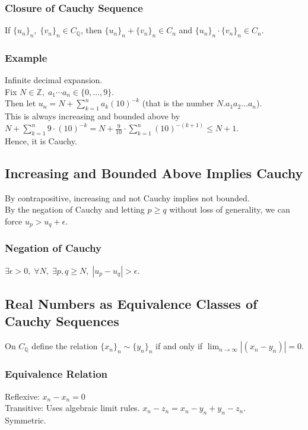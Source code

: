 \documentclass[11pt]{article}
\newcommand{\0}{\emptyset}
\newcommand{\Z}{\mathbb{Z}}
\newcommand{\Q}{\mathbb{Q}}
\begin{document}
\subsubsection*{Closure of Cauchy Sequence}
\label{sec:orgbc2540f}
If \(\{u_{n}\}_{n},\;\{v_{n}\}_{n}\in C_{\Q}\), then \(\{u_{n}\}_{n}+\{v_{n}\}_{n}\in C_{n}\) and \(\{u_{n}\}_{n}\cdot\{v_{n}\}_{n}\in C_{n}\).\\[0pt]
\subsubsection*{Example}
\label{sec:org826c81a}
Infinite decimal expansion.\\[0pt]
Fix \(N\in\Z,\; a_{1}\cdots a_{n}\in\{0,\ldots,9\}\).\\[0pt]
Then let \(u_{n}=N+\sum_{k=1}^{n}a_{k}(10)^{-k}\) (that is the number \(N.a_{1}a_{2}\ldots a_{n}\)).\\[0pt]
This is always increasing and bounded above by \(N+\sum_{k=1}^{n}9\cdot(10)^{-k}=N+\frac{9}{10}\cdot\sum_{k=1}^{n}(10)^{-(k+1)}\leq N+1\).\\[0pt]
Hence, it is Cauchy.\\[0pt]
\subsection*{Increasing and Bounded Above Implies Cauchy}
\label{sec:org15bec59}
By contrapositive, increasing and not Cauchy implies not bounded.\\[0pt]
By the negation of Cauchy and letting \(p\geq q\) without loss of generality, we can force \(u_{p}> u_{q}+\epsilon\).\\[0pt]
\subsubsection*{Negation of Cauchy}
\label{sec:org9954fab}
\(\exists\epsilon>0,\;\forall N,\;\exists p,q\geq N,\;|u_{p}-u_{q}|>\epsilon\).\\[0pt]
\subsection*{Real Numbers as Equivalence Classes of Cauchy Sequences}
\label{sec:orga4d61b3}
On \(C_{\Q}\) define the relation \(\{x_{n}\}_{n}\sim\{y_{n}\}_{n}\) if and only if \(\lim_{n\to\infty}|(x_{n}-y_{n})|=0\).\\[0pt]
\subsubsection*{Equivalence Relation}
\label{sec:org7e4565d}
Reflexive: \(x_{n}-x_{n}=0\)\\[0pt]
Transitive: Uses algebraic limit rules. \(x_{n}-z_{n}=x_{n}-y_{n}+y_{n}-z_{n}\).\\[0pt]
Symmetric.\\[0pt]
\end{document}
